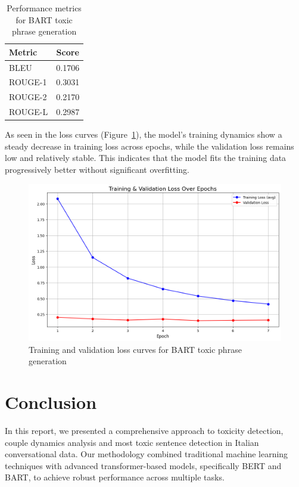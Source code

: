 \documentclass[conference]{IEEEtran}
\begin{document}
\begin{table}[H]
  \centering
  \begin{tabular}{lc}
    \toprule
    \textbf{Metric} & \textbf{Score} \\
    \midrule
    BLEU & 0.1706 \\
    ROUGE-1 & 0.3031 \\
    ROUGE-2 & 0.2170 \\
    ROUGE-L & 0.2987 \\
    \bottomrule
  \end{tabular}
  \caption{Performance metrics for BART toxic phrase generation}
  \label{tab:bart_toxic_generation}
\end{table}

As seen in the loss curves (Figure~\ref{fig:bart_loss_toxic}), the model's training dynamics show a steady decrease in training loss across epochs, while the validation loss remains low and relatively stable. This indicates that the model fits the training data progressively better without significant overfitting.

\begin{figure}[H]
  \centering
  \includegraphics[width=\columnwidth]{figures/bart_toxic_loss_curves.png}
  \caption{Training and validation loss curves for BART toxic phrase generation}
  \label{fig:bart_loss_toxic}
\end{figure}

\section{Conclusion}

In this report, we presented a comprehensive approach to toxicity detection, couple dynamics analysis and most toxic sentence detection in Italian conversational data. Our methodology combined traditional machine learning techniques with advanced transformer-based models, specifically BERT and BART, to achieve robust performance across multiple tasks.
\end{document}
